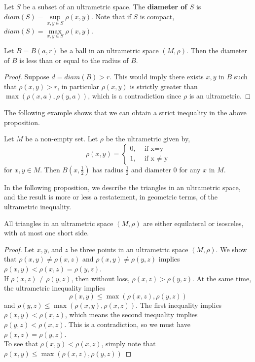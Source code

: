 \begin{definition}
Let $S$ be a subset of an ultrametric space. The \textbf{diameter of $S$} is $diam(S) = \sup\limits_{x,y\in S}\rho(x,y)$. Note that if $S$ is compact, $diam(S) = \max\limits_{x,y\in S}\rho(x,y)$.
\end{definition}

\begin{proposition}
	Let $B=B(a, r)$ be a ball in an ultrametric space $(M,\rho)$. Then the diameter of $B$ is less than or equal to the radius of $B$.    
\end{proposition}

\begin{proof}
Suppose $d = diam(B) > r$. This would imply there exists $x,y$ in $B$ such that $\rho(x,y) > r$, in particular $\rho(x,y)$ is strictly greater than $\max(\rho(x,a), \rho(y,a))$, which is a contradiction since $\rho$ is an ultrametric.
\end{proof}
 
The following example shows that we can obtain a strict inequality in the above proposition.

\begin{example}
	Let $M$ be a non-empty set. Let $\rho$ be the ultrametric given by, 
	\[
	\rho(x,y) = 
	\begin{cases}
		0, & \text{ if x=y} \\
		1, & \text{ if x } \neq \text{ y}
	\end{cases}
	\]
for $x,y \in M$. Then $B(x, \frac{1}{2})$ has radius $\frac{1}{2}$ and diameter $0$ for any $x$ in $M$.
\end{example}

In the following proposition, we describe the triangles in an ultrametric space, and the result is more or less a restatement, in geometric terms, of the ultrametric inequality.\\

\begin{proposition}
	 All triangles in an ultrametric space $(M,\rho)$ are either equilateral or isosceles, with at most one short side. 
\end{proposition}

\begin{proof}
Let $x,y$, and $z$ be three points in an ultrametric space $(M,\rho)$. We show that $\rho(x,y) \neq \rho(x,z)$ and $\rho(x,y) \neq \rho(y,z)$ implies $\rho(x,y) < \rho(x,z) = \rho(y,z)$.\\

If $\rho(x,z) \neq \rho(y,z)$, then without loss, $\rho(x,z) > \rho(y,z)$. At the same time, the ultrametric inequality implies \[\rho(x,y) \leq \max(\rho(x,z), \rho(y,z))\] and  $\rho(y,z) \leq \max(\rho(x,y), \rho(x,z))$. The first inequality implies $\rho(x,y) < \rho(x,z)$, which means the second inequality implies $\rho(y,z) < \rho(x,z)$. This is a contradiction, so we must have $\rho(x,z) = \rho(y,z)$.\\

To see that $\rho(x,y) < \rho(x,z)$, simply note that $\rho(x,y) \leq \max(\rho(x,z), \rho(y,z))$
\end{proof}

